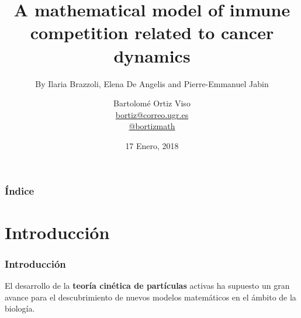 \documentclass{beamer}
\title[Inmune competition and cancer dynamics]{
  A mathematical model of inmune competition related to cancer dynamics}
\subtitle{By Ilaria Brazzoli, Elena De Angelis and Pierre-Emmanuel Jabin}
\author[Bartolomé Ortiz Viso]{
  Bartolomé Ortiz Viso \\\medskip
  {\small \url{bortiz@correo.ugr.es}} \\ 
  {\small \url{@bortizmath}}}
\institute[Universidad de Granada]{
  EDP de transporte  \\
  Máster en Física y Matemáticas}
\date[17 Enero, 2018]{
  17 Enero, 2018}
\begin{document}
\begin{frame}
  \titlepage
\end{frame}

\begin{frame}
  \frametitle{Índice}

  \tableofcontents
\end{frame}

\section{Introducción}

\begin{frame}
  \frametitle{Introducción}
El desarrollo de la \textbf{teoría cinética de partículas} activas ha supuesto un gran avance para el descubrimiento de nuevos modelos matemáticos en el ámbito de la biología.


\end{frame}
\end{document}
